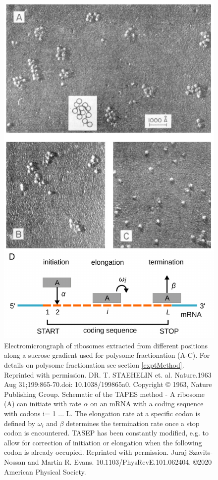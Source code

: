 \documentclass[12pt,openany]{book}
\begin{document}
\begin{figure}
  \includegraphics{./figures/polysome.pdf}
  \caption{Electromicrongraph of ribosomes extracted from different positions along a sucrose gradient used for polysome fractionation (A-C). For details on polysome fractionation see section \ref{exptMethod}. Reprinted with permission. DR. T. STAEHELIN et. al. Nature.1963 Aug 31;199:865-70.doi: 10.1038/199865a0. Copyright © 1963, Nature Publishing Group.
  Schematic of the TAPES method - A ribosome (A) can initiate with rate \(\alpha\) on an mRNA with a coding sequence with codons i= 1 ... L. The elongation rate at a specific codon is defined by \(\omega_i\) and \(\beta\) determines the termination rate once a stop codon is encountered. TASEP has been constantly modified, e.g. to allow for correction of initiation or elongation when the following codon is already occupied. Reprinted with permission. Juraj Szavits-Nossan and Martin R. Evans. 10.1103/PhysRevE.101.062404. ©2020 American Physical Society. 
 \label{fig:polysomes}}
\end{figure}
\end{document}
